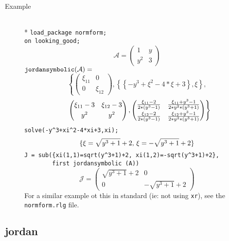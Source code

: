 \begin{description}
\item[Example]\mbox{}\\*
%
\texttt{load\_package normform;}\\
\texttt{on looking\_good;}
\[
\mathcal{A} = \begin{pmatrix} 1 & y \\ y^2 & 3 \end{pmatrix}
\]
\(
\texttt{jordansymbolic}(\mathcal{A}) =
\)
\[
 \left\{
     \begin{pmatrix} \xi_{11} & 0 \\ 0 & \xi_{12} \end{pmatrix} ,
     \left\{ \left\{ -y^3+\xi^2-4*\xi+3 \right\}, \xi \right\}, \right.
\]
\[
 \hspace{0.1in} \left.
       \begin{pmatrix} \xi_{11} -3 & \xi_{12} -3 \\[1mm] y^2 & y^2 \end{pmatrix},
       \begin{pmatrix} \frac{\xi_{11} -2} {2*(y^3-1)}
                 & \frac{\xi_{11} + y^3 -1}{2*y^2*(y^3+1)} \\[1mm]
                \frac{\xi_{12} -2}{2*(y^3-1)}
                 & \frac{\xi_{12}+y^3-1}{2*y^2*(y^3+1)}
       \end{pmatrix}
  \right\}
\]
\texttt{solve(-y\^{}3+xi\^{}2-4*xi+3,xi);}
\[
\{ \xi = \sqrt{y^3+1} + 2,\, \xi = -\sqrt{y^3+1}+2 \} \\
\]
\texttt{J = sub(\{xi(1,1)=sqrt(y\^{}3+1)+2, xi(1,2)=-sqrt(y\^{}3+1)+2\},
   \mbox{}\ \ \ \ \ \ \ \ first  jordansymbolic (A))}
%
\[
\mathcal{J} = \begin{pmatrix} \sqrt{y^3+1} + 2 & 0 \\ 0 &
-\sqrt{y^3+1} + 2 \end{pmatrix}
\]
For a similar example ot this in standard {\REDUCE} (ie: not using
\texttt{xr}), see the \texttt{normform.rlg} file.
\end{description}

\subsection{jordan}

